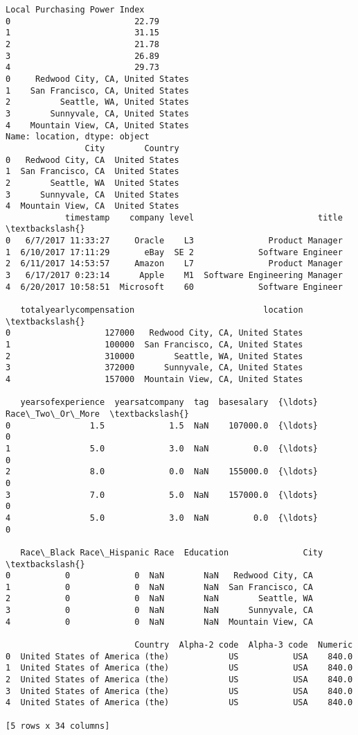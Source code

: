 \documentclass[11pt]{article}
\begin{document}
\begin{Verbatim}[commandchars=\\\{\}]
   Local Purchasing Power Index
0                         22.79
1                         31.15
2                         21.78
3                         26.89
4                         29.73
0     Redwood City, CA, United States
1    San Francisco, CA, United States
2          Seattle, WA, United States
3        Sunnyvale, CA, United States
4    Mountain View, CA, United States
Name: location, dtype: object
                City        Country
0   Redwood City, CA  United States
1  San Francisco, CA  United States
2        Seattle, WA  United States
3      Sunnyvale, CA  United States
4  Mountain View, CA  United States
            timestamp    company level                         title  \textbackslash{}
0   6/7/2017 11:33:27     Oracle    L3               Product Manager
1  6/10/2017 17:11:29       eBay  SE 2             Software Engineer
2  6/11/2017 14:53:57     Amazon    L7               Product Manager
3   6/17/2017 0:23:14      Apple    M1  Software Engineering Manager
4  6/20/2017 10:58:51  Microsoft    60             Software Engineer

   totalyearlycompensation                          location  \textbackslash{}
0                   127000   Redwood City, CA, United States
1                   100000  San Francisco, CA, United States
2                   310000        Seattle, WA, United States
3                   372000      Sunnyvale, CA, United States
4                   157000  Mountain View, CA, United States

   yearsofexperience  yearsatcompany  tag  basesalary  {\ldots}  Race\_Two\_Or\_More  \textbackslash{}
0                1.5             1.5  NaN    107000.0  {\ldots}                 0
1                5.0             3.0  NaN         0.0  {\ldots}                 0
2                8.0             0.0  NaN    155000.0  {\ldots}                 0
3                7.0             5.0  NaN    157000.0  {\ldots}                 0
4                5.0             3.0  NaN         0.0  {\ldots}                 0

   Race\_Black Race\_Hispanic Race  Education               City  \textbackslash{}
0           0             0  NaN        NaN   Redwood City, CA
1           0             0  NaN        NaN  San Francisco, CA
2           0             0  NaN        NaN        Seattle, WA
3           0             0  NaN        NaN      Sunnyvale, CA
4           0             0  NaN        NaN  Mountain View, CA

                          Country  Alpha-2 code  Alpha-3 code  Numeric
0  United States of America (the)            US           USA    840.0
1  United States of America (the)            US           USA    840.0
2  United States of America (the)            US           USA    840.0
3  United States of America (the)            US           USA    840.0
4  United States of America (the)            US           USA    840.0

[5 rows x 34 columns]
    \end{Verbatim}
\end{document}
